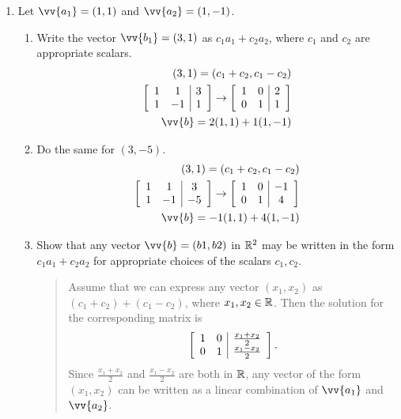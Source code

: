 \documentclass{hw}
\begin{document}

\begin{enumerate}
\item Let $\vv{a_{1}} = (1,1)$ and $\vv{a_{2}} = (1,-1)$.
\begin{enumerate}
\item Write the vector $\vv{b_{1}} = (3, 1)$ as $c_{1}a_{1} + c_{2}a_{2}$, where
$c_{1}$ and $c_{2}$ are appropriate scalars.
\begin{align*}
(3,1) = (c_{1} + c_{2}, c_{1} - c_{2})\\
\left[
\begin{array}{c c | c}
1 & 1 & 3\\
1 & -1 & 1
\end{array}
\right] \to
\left[
\begin{array}{c c | c}
1 & 0 & 2\\
0 & 1 & 1
\end{array}
\right]\\
\vv{b} = 2(1,1) + 1(1,-1)
\end{align*}

\item Do the same for $(3,-5)$.
\begin{align*}
(3,1) = (c_{1} + c_{2}, c_{1} - c_{2})\\
\left[
\begin{array}{c c | c}
1 & 1 & 3\\
1 & -1 & -5
\end{array}
\right] \to
\left[
\begin{array}{c c | c}
1 & 0 & -1\\
0 & 1 & 4
\end{array}
\right]\\
\vv{b} = -1(1,1) + 4(1,-1)
\end{align*}

\item Show that any vector $\vv{b} = (b1, b2)$ in $\mathbb{R}^{2}$ may be written in the form $c_{1} a_{1} +
c_{2} a_{2}$ for appropriate choices of the scalars $c_{1}, c_{2}$.
\begin{quote}
Assume that we can express any vector $(x_{1},x_{2})$ as $(c_{1} + c_{2}) + (c_{1} - c_{2})$, where
$x_{1},x_{2}\in\mathbb{R}$. Then the solution for the corresponding matrix is
\[
\left[
\begin{array}{c c | c}
1 & 0 & \frac{x_{1} + x_{2}}{2}\\
0 & 1 & \frac{x_{1} - x_{2}}{2}
\end{array}
\right].
\]
Since $\frac{x_{1} + x_{2}}{2}$ and $\frac{x_{1} - x_{2}}{2}$ are both in $\mathbb{R}$, any vector of the form
$(x_{1},x_{2})$ can be written as a linear combination of $\vv{a_{1}}$ and $\vv{a_{2}}$.
\end{quote}
\end{enumerate}


\end{enumerate}
\end{document}
